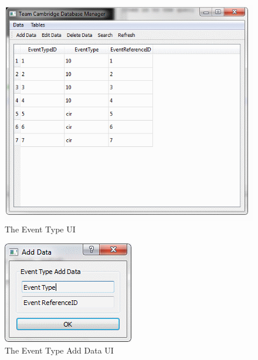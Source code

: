 \begin{figure}
\includegraphics[width=\textwidth]{./Maintenance/UI/EventType.png}
\caption{The Event Type UI} \label{fig:EventType_UI}
\end{figure}

\begin{figure}
\includegraphics[width=\textwidth]{./Maintenance/UI/EventTypeAD.png}
\caption{The Event Type Add Data UI} \label{fig:EventTypeAD_UI}
\end{figure}

